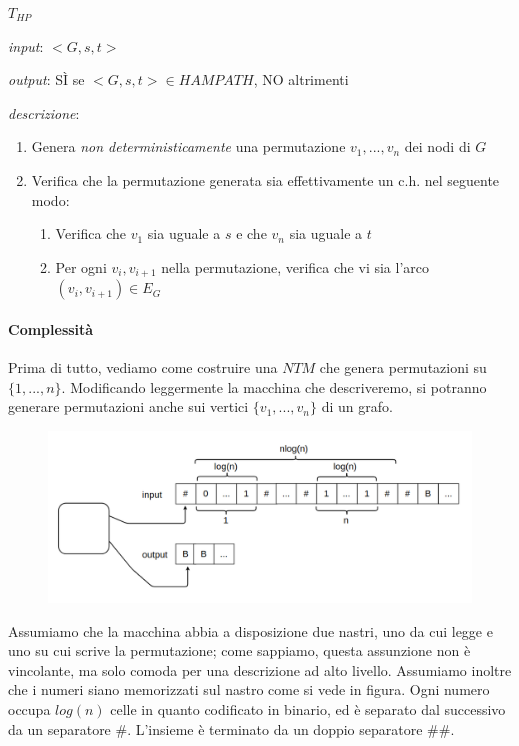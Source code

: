 $T_{HP}$
\begin{description}
	\item \textit{input}: $<G, s, t>$

	\item \textit{output}: SÌ se $<G,s,t> \in HAMPATH$, NO altrimenti

	\item \textit{descrizione}:
	\begin{enumerate}[label*=\arabic*.]
		\item Genera \textit{non deterministicamente} una permutazione $v_1, ..., v_n$ dei nodi di $G$

		\item Verifica che la permutazione generata sia effettivamente un c.h. nel seguente modo:
		\begin{enumerate}[label*=\arabic*.]
			\item Verifica che $v_1$ sia uguale a $s$ e che $v_n$ sia uguale a $t$
			\item Per ogni $v_i, v_{i+1}$ nella permutazione, verifica che vi sia l'arco $(v_i, v_{i+1}) \in E_G$
		\end{enumerate}
	\end{enumerate}
\end{description}

\paragraph{Complessità} Prima di tutto, vediamo come costruire una $NTM$ che genera permutazioni su $\{1, ..., n\}$. Modificando leggermente la macchina che descriveremo, si potranno generare permutazioni anche sui vertici $\{v_1, ..., v_n\}$ di un grafo.
\begin{figure}[H]
	\centering
	\includegraphics[width=\textwidth]{automa-permutazione}
\end{figure}

Assumiamo che la macchina abbia a disposizione due nastri, uno da cui legge e uno su cui scrive la permutazione; come sappiamo, questa assunzione non è vincolante, ma solo comoda per una descrizione ad alto livello. Assumiamo inoltre che i numeri siano memorizzati sul nastro come si vede in figura. Ogni numero occupa $log(n)$ celle in quanto codificato in binario, ed è separato dal successivo da un separatore $\#$. L'insieme è terminato da un doppio separatore $\#\#$.

